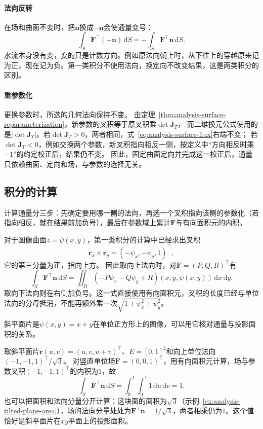 \paragraph{法向反转}

在场和曲面不变时，把$\bm n$换成$-\bm n$会使通量变号：
\[
 \int_S\bm F^\top(-\bm n)\,\mathrm dS
 =-\int_S\bm F^\top\bm n\,\mathrm dS.
\]
水流本身没有变，变的只是计数方向。例如原法向朝上时，从下往上的穿越原来记为正，现在记为负。第一类积分不使用法向，换定向不改变结果，这是两类积分的区别。

\paragraph{重参数化}

更换参数时，所选的几何法向保持不变。
由定理~\ref{thm:analysis-surface-reparameterization}，新参数的叉积等于原叉积乘$\det\bm J_T$，
而二维换元公式使用的是$|\det\bm J_T|$。若$\det\bm J_T>0$，两者相同，式~\eqref{eq:analysis-surface-flux}右端不变；
若$\det\bm J_T<0$，例如交换两个参数，新叉积指向相反一侧，按定义中“方向相反时乘$-1$”的约定校正后，结果仍不变。
因此，固定曲面定向并完成这一校正后，通量只依赖曲面、定向和场，与参数的选择无关。

\subsection{积分的计算}

计算通量分三步：先确定要用哪一侧的法向，再选一个叉积指向该侧的参数化（若指向相反，就在结果前加负号），最后在参数域上累计$\bm F$与有向面积元的内积。

对于图像曲面$z=\psi(x,y)$，第一类积分的计算中已经求出叉积
\[
 \bm r_x\times\bm r_y=(-\psi_x,-\psi_y,1)^\top,
\]
它的第三分量为正，指向上方。
因此取向上法向时，对$\bm F=(P,Q,R)^\top$有
\begin{equation}
 \int_S\bm F^\top\bm n\,\mathrm dS
 =\iint_D(-P\psi_x-Q\psi_y+R)(x,y,\psi(x,y))\,\mathrm dx\,\mathrm dy.
 \label{eq:analysis-graph-surface-flux}
\end{equation}
取向下法向则在右侧加负号。这一式直接使用有向面积元，叉积的长度已经与单位法向的分母抵消，不能再额外乘一次$\sqrt{1+\psi_x^2+\psi_y^2}$。

斜平面片是$\psi(x,y)=x+y$在单位正方形上的图像，可以用它核对通量与投影面积的关系。

\begin{example}[斜平面片上的竖直通量]
\label{ex:analysis-tilted-plane-flux}
取斜平面片$\bm r(u,v)=(u,v,u+v)^\top$、$E=[0,1]^2$和向上单位法向$(-1,-1,1)^\top/\sqrt3$。
对竖直单位场$\bm F=(0,0,1)^\top$，用有向面积元计算，场与参数叉积$(-1,-1,1)^\top$的内积为$1$，故
\[
 \int_S\bm F^\top\bm n\,\mathrm dS
 =\int_0^1\int_0^1 1\,\mathrm du\,\mathrm dv=1.
\]
也可以把面积和法向分量分开计算：这块面的面积为$\sqrt3$（示例~\ref{ex:analysis-tilted-plane-area}），场的法向分量处处为$\bm F^\top\bm n=1/\sqrt3$，两者相乘仍为$1$。这个值恰好是斜平面片在$xy$平面上的投影面积。
\end{example}

